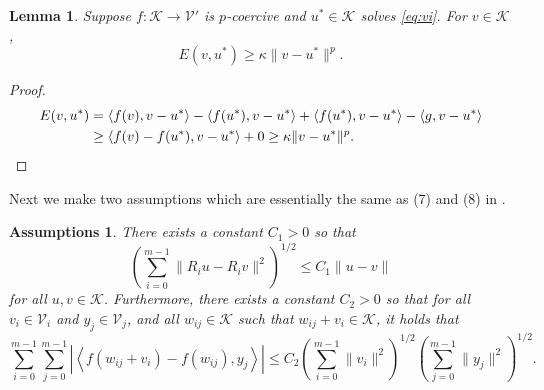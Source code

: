 \documentclass[letterpaper,final,12pt,reqno]{amsart}
\theoremstyle{cstyle}
\newtheorem{lemma}[theorem]{Lemma}
\theoremstyle{cstyle*}
\newtheorem{assumptions*}{Assumptions}
\theoremstyle{dstyle}
\numberwithin{equation}{section}
\numberwithin{figure}{section}
\numberwithin{table}{section}
\numberwithin{theorem}{section}
\newcommand{\cK}{\mathcal{K}}
\newcommand{\cV}{\mathcal{V}}
\newcommand{\ip}[2]{\left<#1,#2\right>}
\begin{document}
\begin{lemma} \label{lem:normlike}  Suppose $f:\mathcal{K} \to \mathcal{V}'$ is $p$-coercive and $u^* \in \mathcal{K}$ solves \eqref{eq:vi}.  For $v \in \mathcal{K}$,
\begin{equation}
  E(v,u^*) \ge \kappa \|v-u^*\|^p.  \label{eq:normlikebound}
\end{equation}
\end{lemma}

\begin{proof}
\begin{align*}
E(v,u^*) &= \ip{f(v)}{v-u^*} - \ip{f(u^*)}{v-u^*} + \ip{f(u^*)}{v-u^*} - \ip{g}{v-u^*} \\
   &\ge \ip{f(v)-f(u^*)}{v-u^*} + 0 \ge \kappa \|v-u^*\|^p.  \qedhere
\end{align*}
\end{proof}

Next we make two assumptions which are essentially the same as (7) and (8) in \cite{Tai2003}.

\begin{assumptions*}  There exists a constant $C_1>0$ so that
\begin{equation}
\left(\sum_{i=0}^{m-1} \|R_i u - R_i v\|^2\right)^{1/2} \le C_1 \|u-v\| \label{as:lipschitzrestrictions}
\end{equation}
for all $u,v\in\cK$.  Furthermore, there exists a constant $C_2>0$ so that for all $v_i \in \cV_i$ and $y_j \in \cV_j$, and all $w_{ij} \in \cK$ such that $w_{ij} + v_i \in \cK$, it holds that
\begin{equation}
\sum_{i=0}^{m-1} \sum_{j=0}^{m-1} \left|\ip{f(w_{ij} + v_i) - f(w_{ij})}{y_j}\right| \le C_2 \left(\sum_{i=0}^{m-1} \|v_i\|^2\right)^{1/2} \left(\sum_{j=0}^{m-1} \|y_j\|^2\right)^{1/2}. \label{as:lipschitzresidual}
\end{equation}
\end{assumptions*}
\end{document}

